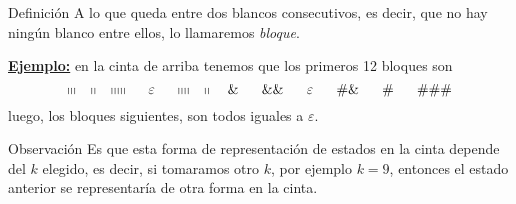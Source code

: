 \begin{frame}
	\begin{block}{Definición}
		\PN A lo que queda entre dos blancos consecutivos, es decir, que no hay ningún blanco entre ellos, lo llamaremos
		\textit{bloque}.
	\end{block}

	\vspace{3mm}
	\PN \underline{\textbf{Ejemplo:}} en la cinta de arriba tenemos que los primeros 12 bloques son
	\begin{equation*}
		\shortmid \shortmid \shortmid \ \ \ \shortmid \shortmid \ \ \ \shortmid \shortmid \shortmid \shortmid \shortmid \ \
		\ \ \varepsilon \ \ \ \ \shortmid \shortmid \shortmid \shortmid \ \ \ \shortmid \shortmid \ \ \ \& \ \ \ \ \ \&\& \
		\ \ \ \ \varepsilon \ \ \ \ \ \#\& \ \ \ \ \ \# \ \ \ \ \ \#\#\#
	\end{equation*}
	\PN luego, los bloques siguientes, son todos iguales a $\varepsilon$.

	\begin{alertblock}{Observación}
		\PN Es que esta forma de representación de estados en la cinta depende del $k$ elegido, es decir, si tomaramos otro
		$k$, por ejemplo $k=9$, entonces el estado anterior se representaría de otra forma en la cinta.
	\end{alertblock}
\end{frame}
